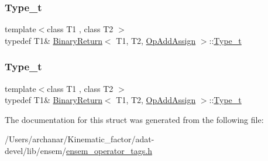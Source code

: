 \mbox{\label{structBinaryReturn_3_01T1_00_01T2_00_01OpAddAssign_01_4_ac69ceb90c901b063de9f436ab55169f5}} 
\subsubsection{\texorpdfstring{Type\_t}{Type\_t}\hspace{0.1cm}{\footnotesize\ttfamily [2/3]}}
{\footnotesize\ttfamily template$<$class T1 , class T2 $>$ \\
typedef T1\& \mbox{\hyperlink{structBinaryReturn}{Binary\+Return}}$<$ T1, T2, \mbox{\hyperlink{structOpAddAssign}{Op\+Add\+Assign}} $>$\+::\mbox{\hyperlink{structBinaryReturn_3_01T1_00_01T2_00_01OpAddAssign_01_4_ac69ceb90c901b063de9f436ab55169f5}{Type\+\_\+t}}}

\mbox{\label{structBinaryReturn_3_01T1_00_01T2_00_01OpAddAssign_01_4_ac69ceb90c901b063de9f436ab55169f5}} 
\subsubsection{\texorpdfstring{Type\_t}{Type\_t}\hspace{0.1cm}{\footnotesize\ttfamily [3/3]}}
{\footnotesize\ttfamily template$<$class T1 , class T2 $>$ \\
typedef T1\& \mbox{\hyperlink{structBinaryReturn}{Binary\+Return}}$<$ T1, T2, \mbox{\hyperlink{structOpAddAssign}{Op\+Add\+Assign}} $>$\+::\mbox{\hyperlink{structBinaryReturn_3_01T1_00_01T2_00_01OpAddAssign_01_4_ac69ceb90c901b063de9f436ab55169f5}{Type\+\_\+t}}}



The documentation for this struct was generated from the following file\+:\begin{DoxyCompactItemize}
\item 
/\+Users/archanar/\+Kinematic\+\_\+factor/adat-\/devel/lib/ensem/\mbox{\hyperlink{adat-devel_2lib_2ensem_2ensem__operator__tags_8h}{ensem\+\_\+operator\+\_\+tags.\+h}}\end{DoxyCompactItemize}

